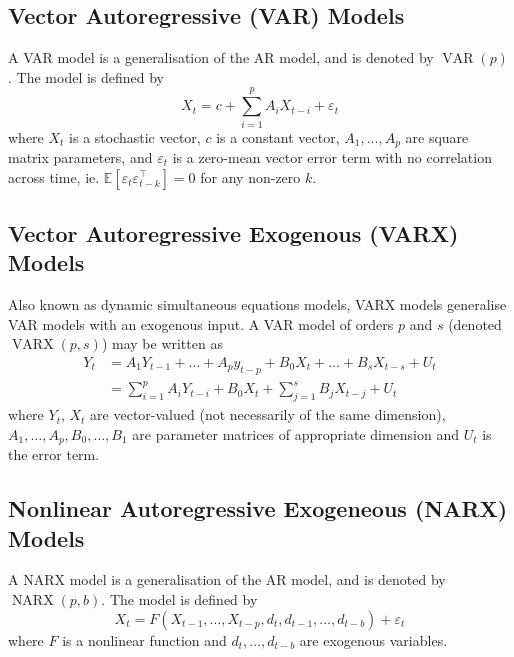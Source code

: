 \documentclass[11pt]{report} %
\begin{document}
\subsection{Vector Autoregressive (VAR) Models}
A VAR model is a generalisation of the AR model, and is denoted by  $\operatorname{VAR}\left(p\right)$. The model is defined by
\begin{equation}
X_{t} = c + \sum_{i = 1}^{p}A_{i}X_{t - i} + \varepsilon_{t}
\end{equation}
where $X_{t}$ is a stochastic vector, $c$ is a constant vector, $A_{1}, \dots, A_{p}$ are square matrix parameters, and $\varepsilon_{t}$ is a zero-mean vector error term with no correlation across time, ie. $\mathbb{E}\left[\varepsilon_{t}\varepsilon_{t - k}^{\top}\right] = 0$ for any non-zero $k$.

\subsection{Vector Autoregressive Exogenous (VARX) Models}

Also known as dynamic simultaneous equations models, VARX models generalise VAR models with an exogenous input. A VAR model of orders $p$ and $s$ (denoted $\operatorname{VARX}\left(p, s\right)$) may be written as
\begin{align}
Y_{t} &= A_{1}Y_{t - 1} + \dots + A_{p}y_{t - p} + B_{0}X_{t} + \dots + B_{s}X_{t - s} + U_{t} \\
&= \sum_{i = 1}^{p}A_{i}Y_{t - i} + B_{0}X_{t} + \sum_{j = 1}^{s}B_{j}X_{t - j} + U_{t}
\end{align}
where $Y_{t}$, $X_{t}$ are vector-valued (not necessarily of the same dimension), $A_{1}, \dots, A_{p}, B_{0}, \dots, B_{1}$ are parameter matrices of appropriate dimension and $U_{t}$ is the error term.

\subsection{Nonlinear Autoregressive Exogeneous (NARX) Models}
A NARX model is a generalisation of the AR model, and is denoted by $\operatorname{NARX}\left(p, b\right)$. The model is defined by
\begin{equation}
X_{t} = F\left(X_{t - 1}, \dots, X_{t - p}, d_{t}, d_{t - 1}, \dots, d_{t - b}\right) + \varepsilon_{t}
\end{equation}
where $F$ is a nonlinear function and $d_{t}, \dots, d_{t - b}$ are exogenous variables.
\end{document}
